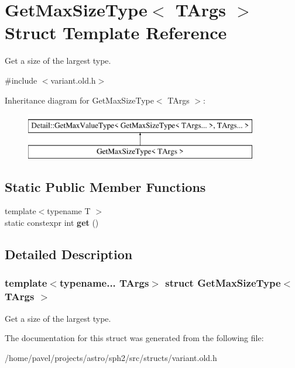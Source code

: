 \hypertarget{structGetMaxSizeType}{}\section{Get\+Max\+Size\+Type$<$ T\+Args $>$ Struct Template Reference}
\label{structGetMaxSizeType}


Get a size of the largest type.  




{\ttfamily \#include $<$variant.\+old.\+h$>$}

Inheritance diagram for Get\+Max\+Size\+Type$<$ T\+Args $>$\+:\begin{figure}[H]
\begin{center}
\leavevmode
\includegraphics[height=2.000000cm]{structGetMaxSizeType}
\end{center}
\end{figure}
\subsection*{Static Public Member Functions}
\begin{DoxyCompactItemize}
\item 
\hypertarget{structGetMaxSizeType_a330706a7d04e2e87d72fadfe81a2629b}{}\label{structGetMaxSizeType_a330706a7d04e2e87d72fadfe81a2629b} 
{\footnotesize template$<$typename T $>$ }\\static constexpr int {\bfseries get} ()
\end{DoxyCompactItemize}


\subsection{Detailed Description}
\subsubsection*{template$<$typename... T\+Args$>$\newline
struct Get\+Max\+Size\+Type$<$ T\+Args $>$}

Get a size of the largest type. 

The documentation for this struct was generated from the following file\+:\begin{DoxyCompactItemize}
\item 
/home/pavel/projects/astro/sph2/src/structs/variant.\+old.\+h\end{DoxyCompactItemize}
